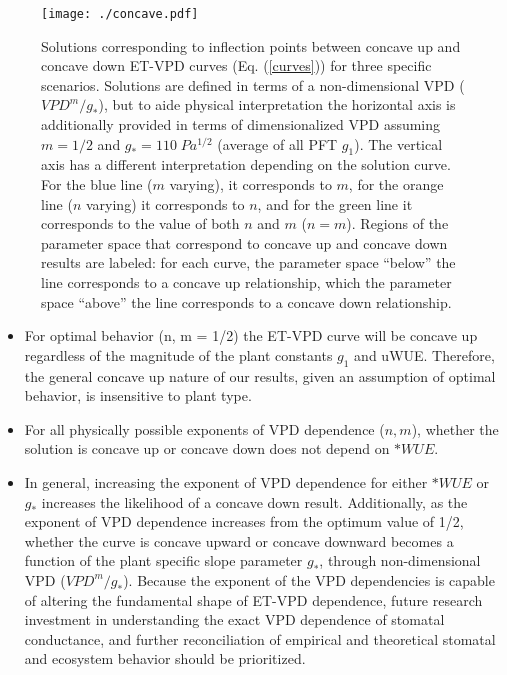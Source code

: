 \documentclass[draft]{agujournal2019}
\begin{document}
\begin{figure}
  \centering
  \centerline{\texttt{[image: ./concave.pdf]}}
  \caption{ Solutions corresponding to inflection points between
    concave up and concave down ET-VPD curves (Eq. (\ref{curves})) for
    three specific scenarios. Solutions are defined in terms of a
    non-dimensional VPD ($VPD^m/g_*$), but to aide physical
    interpretation the horizontal axis is additionally provided in
    terms of dimensionalized VPD assuming $m=1/2$ and
    $g_*=110\; Pa^{1/2}$ (average of all PFT $g_1$). The vertical axis
    has a different interpretation depending on the solution
    curve. For the blue line ($m$ varying), it corresponds to $m$, for
    the orange line ($n$ varying) it corresponds to $n$, and for the
    green line it corresponds to the value of both $n$ and $m$
    ($n=m$). Regions of the parameter space that correspond to concave
    up and concave down results are labeled: for each curve, the
    parameter space ``below'' the line corresponds to a concave up
    relationship, which the parameter space ``above'' the line
    corresponds to a concave down relationship.}
  \label{concave}
\end{figure}

\begin{itemize}
  \item For optimal behavior (n, m = 1/2) the ET-VPD curve will be
    concave up regardless of the magnitude of the plant constants
    $g_1$ and uWUE. Therefore, the general concave up nature of our
    results, given an assumption of optimal behavior, is insensitive
    to plant type.
  \item For all physically possible exponents of VPD dependence ($n,
    m$), whether the solution is concave up or concave down does not
    depend on $*WUE$.
  \item In general, increasing the exponent of VPD dependence for
    either $*WUE$ or $g_*$ increases the likelihood of a concave down
    result. Additionally, as the exponent of VPD dependence increases
    from the optimum value of 1/2, whether the curve is concave upward
    or concave downward becomes a function of the plant specific slope
    parameter $g_*$, through non-dimensional VPD
    ($VPD^m/g_*$). Because the exponent of the VPD dependencies is
    capable of altering the fundamental shape of ET-VPD dependence,
    future research investment in understanding the exact VPD
    dependence of stomatal conductance, and further reconciliation of
    empirical and theoretical stomatal and ecosystem behavior should
    be prioritized.
\end{itemize}
\end{document}
